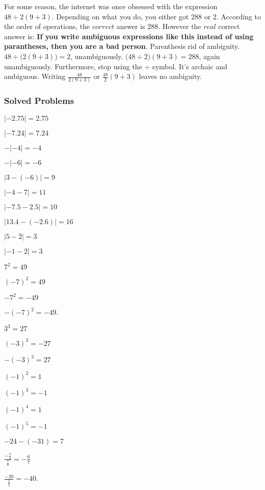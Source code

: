\documentclass[crop=false,class=book,oneside]{standalone}
\begin{document}
            \begin{remark}
            For some reason, the internet was once obsessed with the expression $48\div 2(9+3)$. Depending on what you do, you either got $288$ or $2$. According to the order of operations, the $correct$ answer is $288$. However the $real$ correct answer is: \textbf{If you write ambiguous expressions like this instead of using parantheses, then you are a bad person}. Parenthesis rid of ambiguity. $48\div\big(2(9+3)\big) = 2$, unambiguously. $\big(48\div 2\big)(9+3) = 288$, again unambiguously. Furthermore, stop using the $\div$ symbol. It's archaic and ambiguous. Writing $\frac{48}{2(9+3)}$ or $\frac{48}{2}(9+3)$ leaves no ambiguity.
            \end{remark}
            \subsubsection{Solved Problems}
            \begin{enumerate}
            \begin{multicols}{4}
            \item $|-2.75| = 2.75$
            \item $|-7.24| = 7.24$
            \item $-|-4| = -4$
            \item $-|-6| = -6$
            \item $|3-(-6)| = 9$
            \item $|-4-7| = 11$
            \item $|-7.5-2.5| = 10$
            \item $|13.4 - (-2.6)| = 16$
            \item $|5-2| = 3$
            \item $|-1-2| = 3$
            \item $7^2 = 49$
            \item $(-7)^2 = 49$
            \item $-7^2 = -49$
            \item $-(-7)^2 = -49$.
            \item $3^3 = 27$
            \item $(-3)^3 = -27$
            \item $-(-3)^3 = 27$
            \item $(-1)^2 = 1$
            \item $(-1)^3 = -1$
            \item $(-1)^4 = 1$
            \item $(-1)^5 = -1$
            \item $-24 - (-31) = 7$
            \item $\frac{-\frac{3}{4}}{\frac{7}{8}} = -\frac{6}{7}$
            \item $\frac{-20}{\frac{1}{2}} = -40$.
            \end{multicols}
            \end{enumerate}
\end{document}
